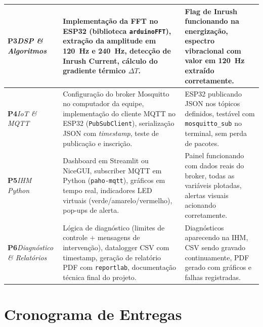 \documentclass[12pt, a4paper]{article}
\begin{document}
\begin{longtable}{>{\centering\arraybackslash}p{2.4cm} >{\raggedright\arraybackslash}p{5.8cm} >{\raggedright\arraybackslash}p{5.8cm}}
\textbf{P3}\newline\textit{DSP \& Algoritmos} &
    Implementação da FFT no ESP32 (biblioteca \texttt{arduinoFFT}), extração
    da amplitude em 120~Hz e 240~Hz, detecção de Inrush Current, cálculo do
    gradiente térmico $\Delta T$. &
    Flag de Inrush funcionando na energização, espectro vibracional com valor
    em 120~Hz extraído corretamente. \\
\midrule

\textbf{P4}\newline\textit{IoT \& MQTT} &
    Configuração do broker Mosquitto no computador da equipe, implementação do
    cliente MQTT no ESP32 (\texttt{PubSubClient}), serialização JSON com
    \textit{timestamp}, teste de publicação e inscrição. &
    ESP32 publicando JSON nos tópicos definidos, testável com
    \texttt{mosquitto\_sub} no terminal, sem perda de pacotes. \\
\midrule

\textbf{P5}\newline\textit{IHM Python} &
    Dashboard em Streamlit ou NiceGUI, subscriber MQTT em Python
    (\texttt{paho-mqtt}), gráficos em tempo real, indicadores LED virtuais
    (verde/amarelo/vermelho), pop-ups de alerta. &
    Painel funcionando com dados reais do broker, todas as variáveis plotadas,
    alertas visuais acionando corretamente. \\
\midrule

\textbf{P6}\newline\textit{Diagnóstico \& Relatórios} &
    Lógica de diagnóstico (limites de controle + mensagens de intervenção),
    datalogger CSV com timestamp, geração de relatório PDF com
    \texttt{reportlab}, documentação técnica final do projeto. &
    Diagnósticos aparecendo na IHM, CSV sendo gravado continuamente, PDF
    gerado com gráficos e falhas registradas. \\

\end{longtable}
\renewcommand{\arraystretch}{1.0}

\section{Cronograma de Entregas}
\end{document}

